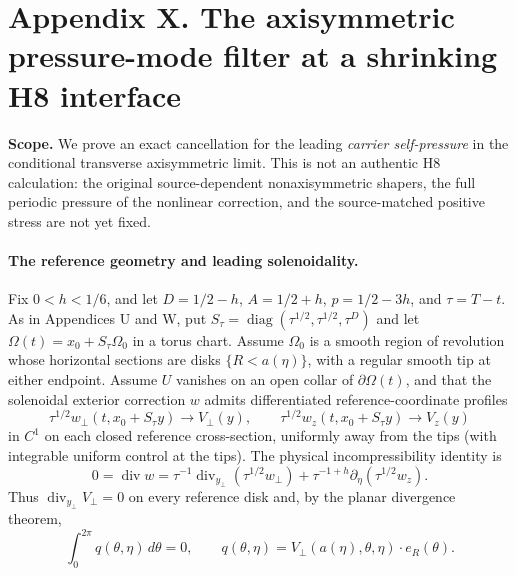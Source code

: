 \clearpage
\section*{Appendix X. The axisymmetric pressure-mode filter at a shrinking H8 interface}
\noindent\textbf{Scope.} We prove an exact cancellation for the leading \emph{carrier self-pressure} in the conditional transverse axisymmetric limit. This is not an authentic H8 calculation: the original source-dependent nonaxisymmetric shapers, the full periodic pressure of the nonlinear correction, and the source-matched positive stress are not yet fixed.

\paragraph{The reference geometry and leading solenoidality.}
Fix $0<h<1/6$, and let $D=1/2-h$, $A=1/2+h$, $p=1/2-3h$, and $\tau=T-t$. As in Appendices U and W, put $S_\tau=\operatorname{diag}(\tau^{1/2},\tau^{1/2},\tau^D)$ and let $\Omega(t)=x_0+S_\tau\Omega_0$ in a torus chart. Assume $\Omega_0$ is a smooth region of revolution whose horizontal sections are disks $\{R<a(\eta)\}$, with a regular smooth tip at either endpoint. Assume $U$ vanishes on an open collar of $\partial\Omega(t)$, and that the solenoidal exterior correction $w$ admits differentiated reference-coordinate profiles
\[
 \tau^{1/2}w_\perp(t,x_0+S_\tau y)\longrightarrow V_\perp(y),\qquad
 \tau^{1/2}w_z(t,x_0+S_\tau y)\longrightarrow V_z(y)
\]
in $C^1$ on each closed reference cross-section, uniformly away from the tips (with integrable uniform control at the tips). The physical incompressibility identity is
\[
 0=\operatorname{div}w
 =\tau^{-1}\operatorname{div}_{y_\perp}(\tau^{1/2}w_\perp)
 +\tau^{-1+h}\partial_\eta(\tau^{1/2}w_z).
\]
Thus $\operatorname{div}_{y_\perp}V_\perp=0$ on every reference disk and, by the planar divergence theorem,
\begin{equation}\label{eq:X-meanflux}
 \boxed{\int_0^{2\pi}q(\theta,\eta)\,d\theta=0,\qquad
 q(\theta,\eta)=V_\perp(a(\eta),\theta,\eta)\cdot e_R(\theta).}
\end{equation}

